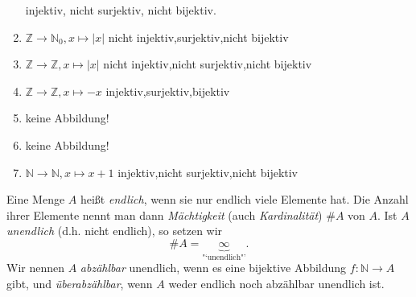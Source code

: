 \documentclass[../../main.tex]{subfiles}
\begin{document}
\begin{bsp}
\begin{enumerate}[\normalfont(a)]
\quad injektiv, nicht surjektiv, nicht bijektiv.
\item $\mathbb{Z}\rightarrow\mathbb{N}_0, x\mapsto |x|$ \quad nicht injektiv,\quad surjektiv,\quad nicht bijektiv
\item $\mathbb{Z}\rightarrow \mathbb{Z}, x\mapsto |x|$ \quad nicht injektiv,\quad nicht surjektiv,\quad nicht bijektiv
\item $\mathbb{Z}\rightarrow\mathbb{Z}, x\mapsto -x$ \quad injektiv,\quad surjektiv,\quad bijektiv
\item {} keine Abbildung!
\item {} keine Abbildung!
\item $\mathbb{N}\rightarrow \mathbb{N}, x\mapsto x+1$ \quad injektiv,\quad nicht surjektiv,\quad nicht bijektiv
\end{enumerate}
\end{bsp}


\begin{df}\label{1.1.21}
Eine Menge $A$ heißt \emph{endlich}, wenn sie nur endlich viele Elemente hat. Die Anzahl ihrer Elemente nennt man dann \emph{Mächtigkeit} (auch \emph{Kardinalität}) $\# A$ von $A$.
Ist $A$ \emph{unendlich} (d.h. nicht endlich), so setzen wir
\[\# A = \underbrace{\infty}_\text{"`unendlich"'}.\] Wir nennen $A$ \emph{abzählbar} unendlich, wenn es eine bijektive Abbildung $f\colon\mathbb{N}\rightarrow A$ gibt, und \emph{überabzählbar}, wenn $A$ weder endlich noch abzählbar unendlich ist.
\end{df}
\end{document}
